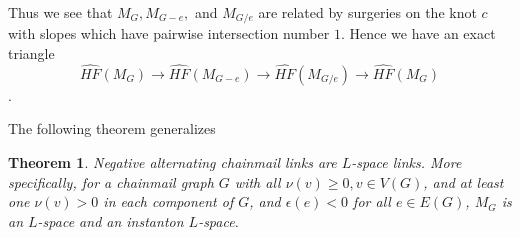 \documentclass{amsart}
\newtheorem{theorem}{Theorem}[section]
\theoremstyle{definition}
\theoremstyle{remark}
\begin{document}
Thus we see that $M_G, M_{G-e},$ and $M_{G/e}$ are related by surgeries on the knot $c$ with slopes which have pairwise intersection number $1$. Hence we have an exact triangle $$\widehat{HF}(M_G)\to \widehat{HF}(M_{G-e}) \to \widehat{HF}(M_{G/e}) \to \widehat{HF}(M_G)$$ \cite[Theorem 9.16]{MR2113020}.

The following theorem generalizes \cite[Example 3.15]{MR3692910}

\begin{theorem} \label{alternating}
Negative alternating chainmail links are $L$-space links. More specifically, for a chainmail graph $G$ with all $\nu(v)\geq 0, v\in V(G)$, and at least one $\nu(v)>0$ in each component of $G$, and $\epsilon(e) < 0$ for all $e\in E(G)$,  $M_G$ is an $L$-space and an instanton $L$-space.
\end{theorem}
\end{document}
